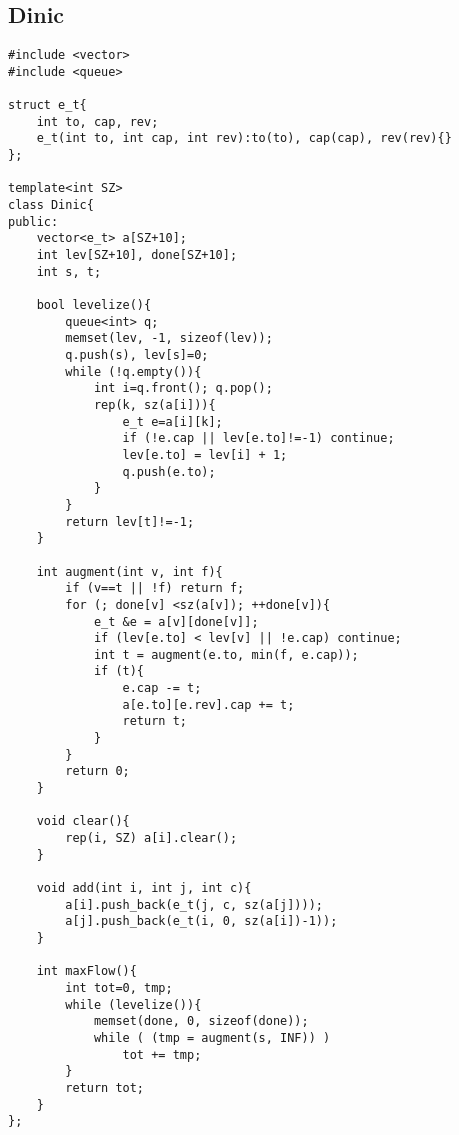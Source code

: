 \subsection{Dinic}
\begin{lstlisting}
#include <vector>
#include <queue>

struct e_t{ 
	int to, cap, rev;
	e_t(int to, int cap, int rev):to(to), cap(cap), rev(rev){}
};

template<int SZ>
class Dinic{
public:
	vector<e_t> a[SZ+10];
	int lev[SZ+10], done[SZ+10];	
	int s, t;

	bool levelize(){
		queue<int> q; 
		memset(lev, -1, sizeof(lev));
		q.push(s), lev[s]=0;
		while (!q.empty()){
			int i=q.front(); q.pop();
			rep(k, sz(a[i])){
				e_t e=a[i][k];
				if (!e.cap || lev[e.to]!=-1) continue;
				lev[e.to] = lev[i] + 1;
				q.push(e.to);
			}
		}
		return lev[t]!=-1;
	}

	int augment(int v, int f){
		if (v==t || !f) return f;
		for (; done[v] <sz(a[v]); ++done[v]){
			e_t &e = a[v][done[v]];
			if (lev[e.to] < lev[v] || !e.cap) continue;
			int t = augment(e.to, min(f, e.cap));
			if (t){
				e.cap -= t;
				a[e.to][e.rev].cap += t;
				return t;
			}
		}
		return 0;
	}

	void clear(){
		rep(i, SZ) a[i].clear();
	}

	void add(int i, int j, int c){
		a[i].push_back(e_t(j, c, sz(a[j])));
		a[j].push_back(e_t(i, 0, sz(a[i])-1));
	}

	int maxFlow(){
		int tot=0, tmp;
		while (levelize()){
			memset(done, 0, sizeof(done));
			while ( (tmp = augment(s, INF)) )
				tot += tmp;
		}
		return tot;
	}
};
\end{lstlisting}
